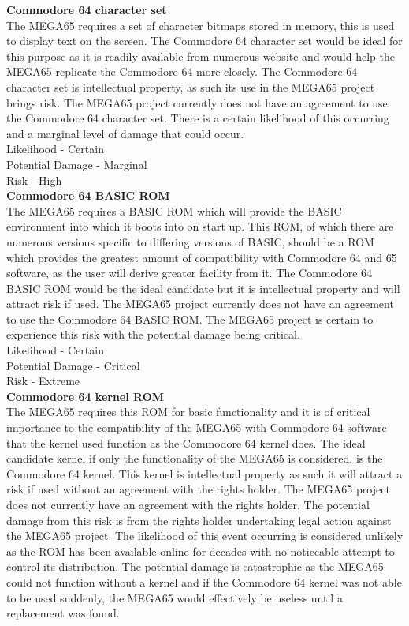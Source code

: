\textbf{Commodore 64 character set}\\
The MEGA65 requires a set of character bitmaps stored in memory, this is used to display text on the screen. The Commodore 64 character set would be ideal for this purpose as it is readily available from numerous website and would help the MEGA65 replicate the Commodore 64 more closely. The Commodore 64 character set is intellectual property, as such its use in the MEGA65 project brings risk. The MEGA65 project currently does not have an agreement to use the Commodore 64 character set. There is a certain likelihood of this occurring and a marginal level of damage that could occur. \\

Likelihood - Certain \\
Potential Damage - Marginal \\
Risk - High  \\


\textbf{Commodore 64 BASIC ROM}\\
The MEGA65 requires a BASIC ROM which will provide the BASIC environment into which it boots into on start up. This ROM, of which there are numerous versions specific to differing versions of BASIC, should be a ROM which provides the greatest amount of compatibility with Commodore 64 and 65 software, as the user will derive greater facility from it. The Commodore 64 BASIC ROM would be the ideal candidate but it is intellectual property and will attract risk if used. The MEGA65 project currently does not have an agreement to use the Commodore 64 BASIC ROM. The MEGA65 project is certain to experience this risk with the potential damage being critical. \\

Likelihood - Certain \\
Potential Damage - Critical \\
Risk - Extreme \\


\textbf{Commodore 64 kernel ROM}\\
The MEGA65 requires this ROM for basic functionality and it is of critical importance to the compatibility of the MEGA65 with Commodore 64 software that the kernel used function as the Commodore 64 kernel does. The ideal candidate kernel if only the functionality of the MEGA65 is considered, is the Commodore 64 kernel. This kernel is intellectual property as such it will attract a risk if used without an agreement with the rights holder. The MEGA65 project does not currently have an agreement with the rights holder. The potential damage from this risk is from the rights holder undertaking legal action against the MEGA65 project. The likelihood of this event occurring is considered unlikely as the ROM has been available online for decades with no noticeable attempt to control its distribution. The potential damage is catastrophic as the MEGA65 could not function without a kernel and if the Commodore 64 kernel was not able to be used suddenly, the MEGA65 would effectively be useless until a replacement was found. \\

